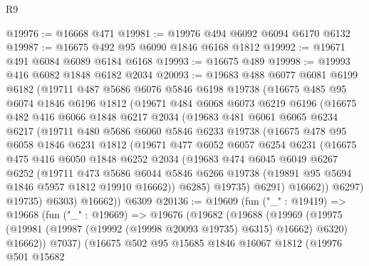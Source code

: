\begin{lexlean}{R9}
\begin{coremodule}
@19976 := @16668 @471
@19981 := @19976 @494 @6092 @6094 @6170 @6132
@19987 := @16675 @492 @95 @6090 @1846 @6168 @1812
@19992 := @19671 @491 @6084 @6089 @6184 @6168
@19993 := @16675 @489
@19998 := @19993 @416 @6082 @1848 @6182 @2034
@20093 := @19683
    @488
    @6077
    @6081
    @6199
    @6182
    (@19711
      @487
      @5686
      @6076
      @5846
      @6198
      @19738
      (@16675
        @485
        @95
        @6074
        @1846
        @6196
        @1812
        (@19671
          @484
          @6068
          @6073
          @6219
          @6196
          (@16675
            @482
            @416
            @6066
            @1848
            @6217
            @2034
            (@19683
              @481
              @6061
              @6065
              @6234
              @6217
              (@19711
                @480
                @5686
                @6060
                @5846
                @6233
                @19738
                (@16675
                  @478
                  @95
                  @6058
                  @1846
                  @6231
                  @1812
                  (@19671
                    @477
                    @6052
                    @6057
                    @6254
                    @6231
                    (@16675
                      @475
                      @416
                      @6050
                      @1848
                      @6252
                      @2034
                      (@19683
                        @474
                        @6045
                        @6049
                        @6267
                        @6252
                        (@19711
                          @473
                          @5686
                          @6044
                          @5846
                          @6266
                          @19738
                          (@19891 @95 @5694 @1846 @5957 @1812 @19910 @16662))
                        @6285)
                      @19735)
                    @6291)
                  @16662))
              @6297)
            @19735)
          @6303)
        @16662))
    @6309
@20136 := @19609
    (fun ("_" : @19419) =>
    @19668
      (fun ("_" : @19669) =>
      @19676
        (@19682
          (@19688
            (@19969
              (@19975 (@19981 (@19987 (@19992 (@19998 @20093 @19735) @6315) @16662) @6320) @16662))
            @7037)
          (@16675
            @502
            @95
            @15685
            @1846
            @16067
            @1812
            (@19976
              @501
              @15682

\end{coremodule}
\end{lexlean}
